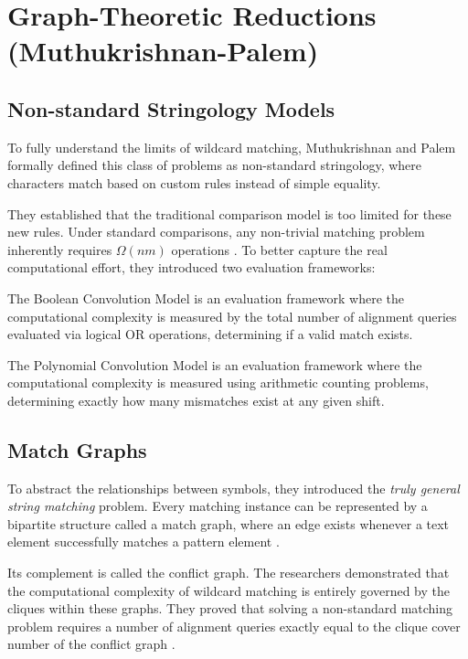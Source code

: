 \chapter{Graph-Theoretic Reductions (Muthukrishnan-Palem)}

\section{Non-standard Stringology Models}
To fully understand the limits of wildcard matching, Muthukrishnan and Palem \cite{mp1994} formally defined this class of problems as non-standard stringology, where characters match based on custom rules instead of simple equality.

They established that the traditional comparison model is too limited for these new rules. Under standard comparisons, any non-trivial matching problem inherently requires $\Omega(nm)$ operations \cite{mp1994}. To better capture the real computational effort, they introduced two evaluation frameworks:

\begin{definition}
The Boolean Convolution Model is an evaluation framework where the computational complexity is measured by the total number of alignment queries evaluated via logical OR operations, determining if a valid match exists.
\end{definition}

\begin{definition}
The Polynomial Convolution Model is an evaluation framework where the computational complexity is measured using arithmetic counting problems, determining exactly how many mismatches exist at any given shift.
\end{definition}

\section{Match Graphs}
To abstract the relationships between symbols, they introduced the \textit{truly general string matching} problem. Every matching instance can be represented by a bipartite structure called a match graph, where an edge exists whenever a text element successfully matches a pattern element \cite{mp1994}. 

Its complement is called the conflict graph. The researchers demonstrated that the computational complexity of wildcard matching is entirely governed by the cliques within these graphs. They proved that solving a non-standard matching problem requires a number of alignment queries exactly equal to the clique cover number of the conflict graph \cite{mp1994}.


